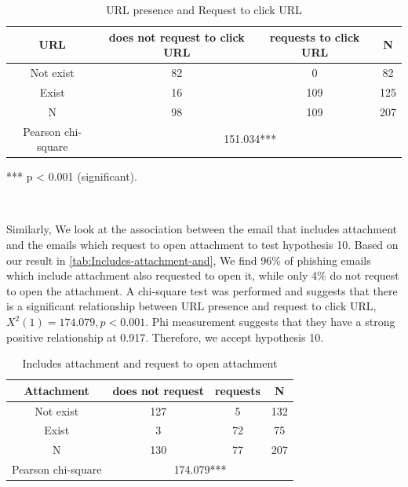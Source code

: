 \begin{minipage}[t]{1\columnwidth}%
\begin{longtable}{cccc}
\caption{\label{tab:URL-presence-and-1}URL presence and Request to click URL}
\tabularnewline
\toprule 
{\footnotesize{}URL} & {\footnotesize{}does not request to click URL} & {\footnotesize{}requests to click URL} & \multirow{1}{*}{{\footnotesize{}N}}\tabularnewline
\midrule 
\multirow{1}{*}{{\footnotesize{}Not exist}} & {\footnotesize{}82} & {\footnotesize{}0} & \multirow{1}{*}{{\footnotesize{}82}}\tabularnewline
\midrule 
\multirow{1}{*}{{\footnotesize{}Exist}} & {\footnotesize{}16} & {\footnotesize{}109} & \multirow{1}{*}{{\footnotesize{}125}}\tabularnewline
\midrule
\midrule 
{\footnotesize{}N} & {\footnotesize{}98} & {\footnotesize{}109} & {\footnotesize{}207}\tabularnewline
\midrule
\midrule 
{\footnotesize{}Pearson chi-square} & \multicolumn{3}{c}{{\footnotesize{}151.034{*}{*}{*}}}\tabularnewline
\midrule
\end{longtable}%
\end{minipage}

{*}{*}{*} p < 0.001 (significant).

\ 

Similarly, We look at the association between the email that includes
attachment and the emails which request to open attachment to test
hypothesis 10. Based on our result in \autoref{tab:Includes-attachment-and},
We find 96\% of phishing emails which include attachment also requested
to open it, while only 4\% do not request to open the attachment.
A chi-square test was performed and suggests that there is a significant
relationship between URL presence and request to click URL, $X^{2}(1)=174.079,p<0.001$.
Phi measurement suggests that they have a strong positive relationship
at 0.917. Therefore, we accept hypothesis 10.

\begin{minipage}[t]{1\columnwidth}%
\begin{longtable}{cccc}
\caption{\label{tab:Includes-attachment-and}Includes attachment and request
to open attachment}
\tabularnewline
\toprule 
{\footnotesize{}Attachment} & {\footnotesize{}does not request} & {\footnotesize{}requests} & \multirow{1}{*}{{\footnotesize{}N}}\tabularnewline
\midrule 
\multirow{1}{*}{{\footnotesize{}Not exist}} & {\footnotesize{}127} & {\footnotesize{}5} & \multirow{1}{*}{{\footnotesize{}132}}\tabularnewline
\midrule 
\multirow{1}{*}{{\footnotesize{}Exist}} & {\footnotesize{}3} & {\footnotesize{}72} & \multirow{1}{*}{{\footnotesize{}75}}\tabularnewline
\midrule
\midrule 
{\footnotesize{}N} & {\footnotesize{}130} & {\footnotesize{}77} & {\footnotesize{}207}\tabularnewline
\midrule
\midrule 
{\footnotesize{}Pearson chi-square} & \multicolumn{3}{c}{{\footnotesize{}174.079{*}{*}{*}}}\tabularnewline
\midrule
\end{longtable}%
\end{minipage}

